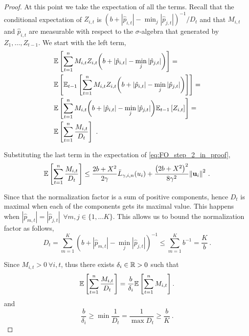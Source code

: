 {\begin{proof}
\noindent
At this point we take  the expectation of all the terms. 
Recall that the conditional expectation of $Z_{i,t}$ is 
$(b+|\hat{p}_{i,t}|-\min_j| \hat{p}_{j,t}|)^{-1}/D_{t}$
and that $M_{i,t}$ and $\hat{p}_{i,t}$ are measurable with respect to the $\sigma$-algebra that generated by $Z_1,\ldots,Z_{t-1}$. 
We start with the left term,
\begin{align*}
\begin{split}
&\mathbb{E}\left[{\sum_{t=1}^{n}M_{i,t}Z_{i,t}{\left({{b
        +\left\vert{\hat{p}_{i,t}}\right\vert}-\min_{j}{\left\vert{ \hat{p}_{j,t}}\right\vert}}\right)}}\right]= \\
        &\mathbb{E}\left[{\mathbb{E}_{t-1}\left[{{\sum_{t=1}^{n}{M_{i,t}Z_{i,t}{\left({b +\left\vert{\hat{p}_{i,t}}\right\vert}-\min_{j}{\left\vert{\hat{p}_{j,t}}\right\vert}\right)}}}}\right]}\right]= \\
&\mathbb{E}\left[{{\sum_{t=1}^{n}M_{i,t}{\left({b +\left\vert{\hat{p}_{i,t}}\right\vert}-\min_{j}{\left\vert \hat{p}_{j,t} \right\vert}\right)}\mathbb{E}_{t-1}\left[{ Z_{i,t}}\right]}}\right]=\\
&\mathbb{E}\left[{\sum_{t=1}^{n}{\frac{M_{i,t}}{D_{t}}}}\right]~.
\end{split}
\end{align*}

\noindent
Substituting the last term in the expectation of
\eqref{eq:FO_step_2_in_proof}, %
\begin{equation}
\mathbb{E}\left[ \sum_{t=1}^{n}{\frac{M_{i,t}}{D_{t}}} \right]
\le \frac{2b+X^2}{2\gamma}{\bar
  L}_{\gamma,i,n}(u_i)+\frac{\left({2b+X^2}\right)^2}{8{\gamma}^2}{\left\Vert
    \mathbf{u}_{i} \right\Vert}^2~.
\label{eq:FO_step_3_in_proof}
\end{equation} 

\noindent
Since that the normalization factor is a sum of positive components,
hence $D_t$ is maximal when each of the components gets its maximal
value. This happens when $\left\vert \hat{p}_{m,t}
\right\vert=\left\vert \hat{p}_{j,t} \right\vert ~~  \forall
m,j \in\{1,\ldots K\}$. This allows us to bound the normalization factor as
follows,
\begin{equation*}
D_{t}=\sum_{m=1}^{K}{\left({b+\left\vert \hat{p}_{m,t}
      \right\vert-\min_{j}{\left\vert \hat{p}_{j,t}
        \right\vert}}\right)^{-1}} \le \sum_{m=1}^{K}{b^{-1}}=\frac{K}{b}~.
\end{equation*}


\noindent
Since $M_{i,t}>0 ~\forall{i,t}$, thus there exists $\delta_i\in\mathbb{R}>0$ such that 
\begin{equation}
\label{eq:FO_introducing_delta}
\mathbb{E}\left[{\sum_{t=1}^{n}{\frac{M_{i,t}}{D_{t}}}}\right] = 
\frac{b}{\delta_i}\mathbb{E}\left[{\sum_{t=1}^{n}{M_{i,t}}}\right].
\end{equation}
and
\begin{equation}
\frac{b}{\delta_i} \geq \min\frac{1}{D_t}  = \frac{1}{\max D_t}  \geq 
\frac{b}{K}~.
\label{eq:FO_bound_on_D}
\end{equation}


\end{proof}}

